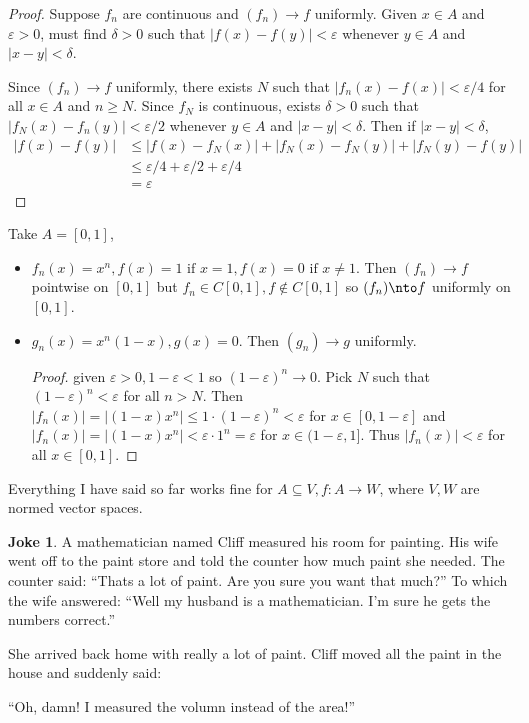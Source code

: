 \documentclass[a4paper]{article}
\theoremstyle{definition}
\newtheorem*{joke}{Joke}
\begin{document}
\begin{proof}
  Suppose \(f_n\) are continuous and \((f_n)\to f\) uniformly. Given \(x\in A\) and \(\varepsilon>0\), must find \(\delta>0\) such that \(|f(x)-f(y)| < \varepsilon\) whenever \(y\in A\) and \(|x-y|<\delta\).

  Since \((f_n)\to f\) uniformly, there exists \(N\) such that \(|f_n(x)-f(x)|< \varepsilon/4\) for all \(x\in A\) and \(n\geq N\). Since \(f_N\) is continuous, exists \(\delta>0\) such that \(|f_N(x)-f_n(y)|<\varepsilon/2\) whenever \(y\in A\) and \(|x-y|<\delta\). Then if \(|x-y| < \delta\),
  \begin{align*}
    |f(x)-f(y)| &\leq |f(x)-f_N(x)| + |f_N(x)-f_N(y)| + |f_N(y)-f(y)| \\
    &\leq \varepsilon/4 + \varepsilon/2 + \varepsilon/4 \\
    &= \varepsilon
  \end{align*}
\end{proof}

\begin{eg}
  Take \(A=[0,1]\),
  \begin{itemize}
  \item \(f_n(x)=x^n, f(x) = 1\text{ if } x=1, f(x)=0 \text{ if } x\neq 1\). Then \((f_n)\to f\) pointwise on \([0,1]\) but \(f_n\in C[0,1], f\notin C[0,1]\) so \((f_n)\nto f\) uniformly on \([0,1]\).
  \item \(g_n(x) = x^n(1-x), g(x) =0\). Then \((g_n)\to g\) uniformly.
\begin{proof}
  given \(\varepsilon>0, 1-\varepsilon<1\) so \((1-\varepsilon)^n\to 0\). Pick \(N\) such that \((1-\varepsilon)^n < \varepsilon\) for all \(n> N\). Then \(|f_n(x)| = |(1-x)x^n| \leq 1\cdot(1-\varepsilon)^n < \varepsilon\) for \(x\in[0,1-\varepsilon]\) and \(|f_n(x)| = |(1-x)x^n| < \varepsilon\cdot1^n=\varepsilon\) for \(x\in (1-\varepsilon,1]\). Thus \(|f_n(x)| < \varepsilon\) for all \(x\in[0,1]\).
\end{proof}
  \end{itemize}
\end{eg}

\begin{rmk}
  Everything I have said so far works fine for \(A\subseteq V, f: A\to W\), where \(V, W\) are normed vector spaces.
\end{rmk}

\begin{joke}
  A mathematician named Cliff measured his room for painting. His wife went off to the paint store and told the counter how much paint she needed. The counter said: ``Thats a lot of paint. Are you sure you want that much?'' To which the wife answered: ``Well my husband is a mathematician. I'm sure he gets the numbers correct.''

  She arrived back home with really a lot of paint. Cliff moved all the paint in the house and suddenly said:

  ``Oh, damn! I measured the volumn instead of the area!''
  \end{joke}
\end{document}
